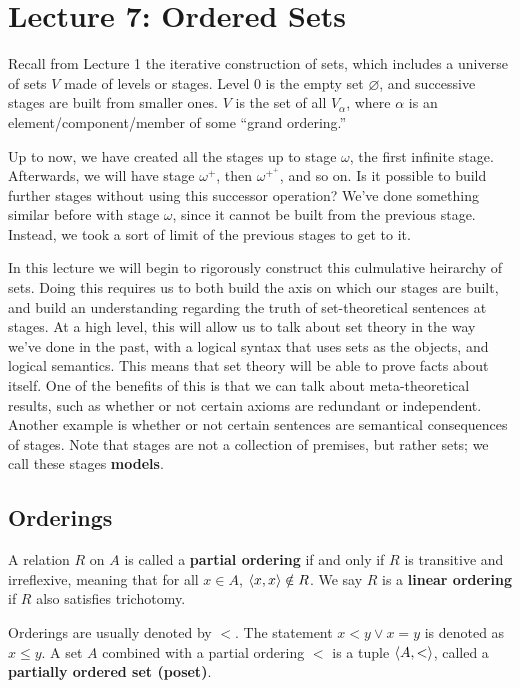 \chapter{Lecture 7: Ordered Sets}

Recall from Lecture 1 the iterative construction of sets, which includes a universe of sets $V$ made of levels or stages. Level 0 is the empty set $\varnothing$, and successive stages are built from smaller ones. $V$ is the set of all $V_\alpha$, where $\alpha$ is an element/component/member of some ``grand ordering.''

Up to now, we have created all the stages up to stage $\omega$, the first infinite stage. Afterwards, we will have stage $\omega^+$, then $\omega^{+^+}$, and so on. Is it possible to build further stages without using this successor operation? We've done something similar before with stage $\omega$, since it cannot be built from the previous stage. Instead, we took a sort of limit of the previous stages to get to it. 

In this lecture we will begin to rigorously construct this culmulative heirarchy of sets. Doing this requires us to both build the axis on which our stages are built, and build an understanding regarding the truth of set-theoretical sentences at stages. At a high level, this will allow us to talk about set theory in the way we've done in the past, with a logical syntax that uses sets as the objects, and logical semantics. This means that set theory will be able to prove facts about itself. One of the benefits of this is that we can talk about meta-theoretical results, such as whether or not certain axioms are redundant or independent. Another example is whether or not certain sentences are semantical consequences of stages. Note that stages are not a collection of premises, but rather sets; we call these stages \textbf{models}. 

\section{Orderings}

\begin{definition}
    A relation $R$ on $A$ is called a \textbf{partial ordering} if and only if $R$ is transitive and irreflexive, meaning that for all $x \in A$, $\left\langle x,x \right\rangle \notin R$. We say $R$ is a \textbf{linear ordering} if $R$ also satisfies trichotomy.
\end{definition}

Orderings are usually denoted by $<$. The statement $x < y \vee x = y$ is denoted as $x \leq y$. A set $A$ combined with a partial ordering $<$ is a tuple $\left\langle A,< \right\rangle$, called a \textbf{partially ordered set (poset)}. 

